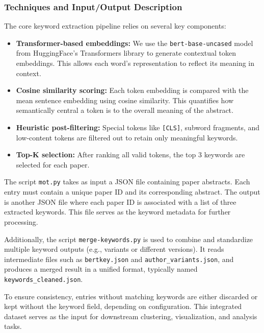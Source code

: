 \documentclass[12pt]{article}
\begin{document}
\subsubsection*{Techniques and Input/Output Description}

The core keyword extraction pipeline relies on several key components:

\begin{itemize}
  \item \textbf{Transformer-based embeddings:} We use the \texttt{bert-base-uncased} model from HuggingFace's Transformers library to generate contextual token embeddings. This allows each word’s representation to reflect its meaning in context.
  
  \item \textbf{Cosine similarity scoring:} Each token embedding is compared with the mean sentence embedding using cosine similarity. This quantifies how semantically central a token is to the overall meaning of the abstract.

  \item \textbf{Heuristic post-filtering:} Special tokens like \texttt{[CLS]}, subword fragments, and low-content tokens are filtered out to retain only meaningful keywords.
  
  \item \textbf{Top-K selection:} After ranking all valid tokens, the top 3 keywords are selected for each paper.
\end{itemize}

The script \texttt{mot.py} takes as input a JSON file containing paper abstracts. Each entry must contain a unique paper ID and its corresponding abstract. The output is another JSON file where each paper ID is associated with a list of three extracted keywords. This file serves as the keyword metadata for further processing.

Additionally, the script \texttt{merge-keywords.py} is used to combine and standardize multiple keyword outputs (e.g., variants or different versions). It reads intermediate files such as \texttt{bertkey.json} and \texttt{author\_variants.json}, and produces a merged result in a unified format, typically named \texttt{keywords\_cleaned.json}.


To ensure consistency, entries without matching keywords are either discarded or kept without the keyword field, depending on configuration. This integrated dataset serves as the input for downstream clustering, visualization, and analysis tasks.
\end{document}

